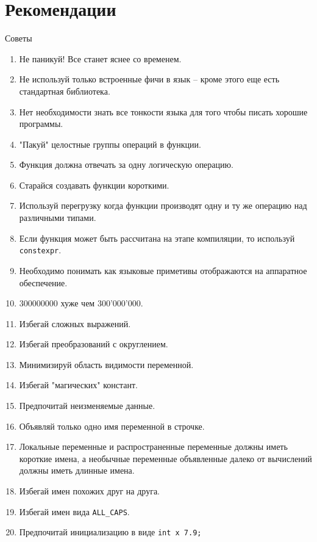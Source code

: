\documentclass[
    9pt,
    hyperref={pdfencoding=unicode}
    ]{beamer}
\theoremstyle{definition}
\begin{document}
\section{Рекомендации}
\begin{frame}[t,allowframebreaks]{Советы}
    \begin{enumerate}
        \item Не паникуй!\textcopyright  \: Все станет яснее со временем.
        \item Не используй только встроенные фичи в язык -- кроме этого еще есть стандартная библиотека.
        \item Нет необходимости знать все тонкости языка для того чтобы писать хорошие программы.
        \item "Пакуй" целостные группы операций в функции.
        \item Функция должна отвечать за одну логическую операцию.
        \item Старайся создавать функции короткими.
        \item Используй перегрузку когда функции производят одну и ту же операцию над различными типами.
        \item Если функция может быть рассчитана на этапе компиляции, то используй \texttt{constexpr}. 
        \item Необходимо понимать как языковые приметивы отображаются на аппаратное обеспечение.
        \item 300000000 хуже чем 300'000'000.
        \item Избегай сложных выражений.
        \item Избегай преобразований с округлением.
        \item Минимизируй область видимости переменной.
        \item Избегай "магических" констант.
        \item Предпочитай неизменяемые данные.
        \item Объявляй только одно имя переменной в строчке.
        \item Локальные переменные и распространенные переменные должны иметь короткие имена, а необычные переменные объявленные далеко от вычислений должны иметь длинные имена.
        \item Избегай имен похожих друг на друга.
        \item Избегай имен вида \texttt{ALL_CAPS}.
        \item Предпочитай инициализацию в виде \texttt{int x {7.9};}

\end{enumerate}
\end{frame}
\end{document}
